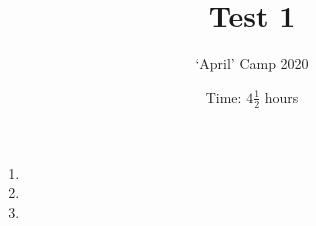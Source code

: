 \documentclass{article}
\title{Test 1}
\author{`April' Camp 2020}
\date{Time: $4\frac{1}{2}$ hours}
\begin{document}
\maketitle
\thispagestyle{empty}


\begin{enumerate}[1.]

\item %


\item %


\item %

\end{enumerate}


\vfill
\centering
\begin{BVerbatim}
\end{BVerbatim}
\end{document}
